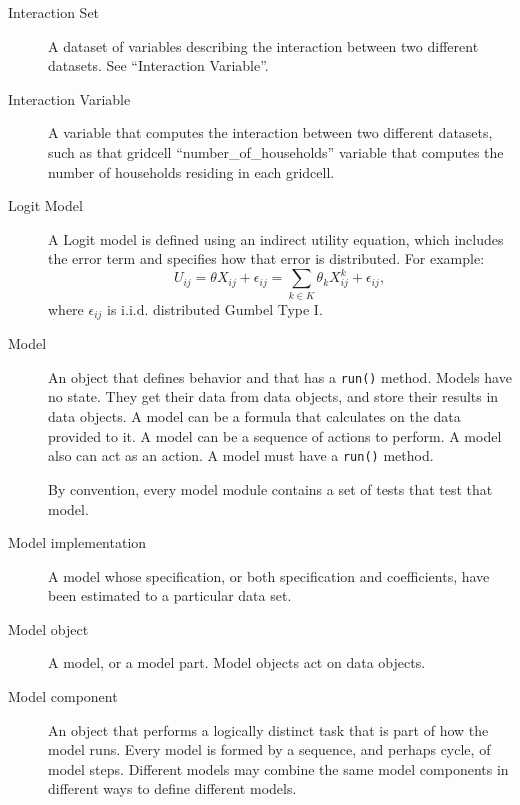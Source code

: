 \begin{description}
\item[Interaction Set] 
A dataset \datasetindex of variables \variablesindex describing the interaction between two
different datasets. \datasetindex  See ``Interaction Variable''. \variablesindex

\item[Interaction Variable] 
A variable \variablesindex that computes the interaction between two different
datasets, \datasetindex such as that gridcell ``number_of_households'' 
variable \variablesindex that computes the number of households residing in
each gridcell.

\item[Logit Model]  
A Logit model is defined using an indirect utility equation, which
includes the error term and specifies how that error is
distributed. For example:
\begin{equation}
    U_{ij}={\theta}{X}_{ij}+\epsilon_{ij}
    =\sum_{k \in K}{\theta}_{k}X^{k}_{ij}+\epsilon_{ij},
\end{equation}
\indent where $\epsilon_{ij}$ is i.i.d. distributed Gumbel Type I.

\item[Model] 
An object that defines behavior and that has a \verb|run()|
method.  Models have no state. They get their data from data
objects, and store their results in data objects.  A model can be
a formula that calculates on the data provided to it. A model can
be a sequence of actions to perform.  A model also can act as an
action.  A model must have a \verb|run()| method.

By convention, every model
module contains a set of tests that test that model.

\item[Model implementation] 
A model whose specification, or both specification and
coefficients, \coefficientsindex have been estimated to a particular data set.

\item[Model object] 
A model, or a model part.  Model objects act on data objects.

\item[Model component] 
An object that performs a logically distinct task that is part of
how the model runs.  Every model is formed by a sequence, and
perhaps cycle, of model steps.  Different models may 
combine the same model components in different ways to define
different models.


\end{description}
